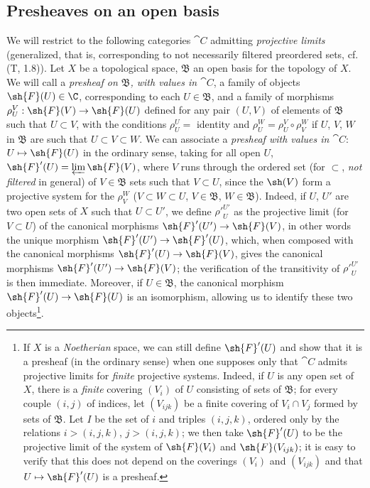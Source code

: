 \subsection{Presheaves on an open basis}
\label{subsection:0.3.2}

\begin{env}[3.2.1]
\label{0.3.2.1}
We will restrict to the following categories $\cat{C}$ admitting \emph{projective
limits} (generalized, that is, corresponding to not necessarily filtered
preordered sets, cf. (T, 1.8)). Let $X$ be a topological space, $\mathfrak{B}$
an open basis for the topology of $X$. We will call a \emph{presheaf on
$\mathfrak{B}$, with values in $\cat{C}$}, a family of objects $\sh{F}(U)\in\C$,
corresponding to each $U\in\mathfrak{B}$, and a family of morphisms $\rho_U^V:\sh{F}(V)\to\sh{F}(U)$ defined for any pair $(U,V)$ of elements of
$\mathfrak{B}$ such that $U\subset V$,
with the conditions $\rho_U^U=$ identity and $\rho_U^W=\rho_U^V\circ\rho_V^W$ if
$U$, $V$, $W$ in $\mathfrak{B}$ are such that $U\subset V\subset W$. We can
associate a \emph{presheaf with values in $\cat{C}$}: $U\mapsto\sh{F}(U)$ in the
ordinary sense, taking for all open $U$, $\sh{F}'(U)=\varprojlim\sh{F}(V)$,
where $V$ runs through the ordered set (for $\subset$, \emph{not filtered} in
general) of $V\in\mathfrak{B}$ sets such that $V\subset U$, since the $\sh(V)$
form a projective system for the $\rho_V^W$ ($V\subset W\subset U$,
$V\in\mathfrak{B}$, $W\in\mathfrak{B}$). Indeed, if $U$, $U'$ are two open sets
of $X$ such that $U\subset U'$, we define ${\rho'}_U^{U'}$ as the projective
limit (for $V\subset U$) of the canonical morphisms $\sh{F}'(U')\to\sh{F}(V)$,
in other words the unique morphism $\sh{F}'(U')\to\sh{F}'(U)$, which, when
composed with the canonical morphisms $\sh{F}'(U)\to\sh{F}(V)$, gives the
canonical morphisms $\sh{F}'(U')\to\sh{F}(V)$; the verification of the
transitivity of ${\rho'}_U^{U'}$ is then immediate. Moreover, if
$U\in\mathfrak{B}$, the canonical morphism $\sh{F}'(U)\to\sh{F}(U)$ is an
isomorphism, allowing us to identify these two objects\footnote{If $X$ is a
\emph{Noetherian} space, we can still define $\sh{F}'(U)$ and show that it is a
presheaf (in the ordinary sense) when one supposes only that $\cat{C}$ admits
projective limits for \emph{finite} projective systems. Indeed, if $U$ is any
open set of $X$, there is a \emph{finite} covering $(V_i)$ of $U$ consisting of
sets of $\mathfrak{B}$; for every couple $(i,j)$ of indices, let $(V_{ijk})$ be
a finite covering of $V_i\cap V_j$ formed by sets of $\mathfrak{B}$. Let $I$ be
the set of $i$ and triples $(i,j,k)$, ordered only by the relations $i>(i,j,k)$,
$j>(i,j,k)$; we then take $\sh{F}'(U)$ to be the projective limit of the system
of $\sh{F}(V_i)$ and $\sh{F}(V_{ijk})$; it is easy to verify that this does not
depend on the coverings $(V_i)$ and $(V_{ijk})$ and that $U\mapsto\sh{F}'(U)$ is
a presheaf.}.
\end{env}

